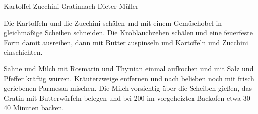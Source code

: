 \begin{recipe}{Kartoffel-Zucchini-Gratin}{nach Dieter Müller}
  \inglist

  \steps
  Die Kartoffeln und die Zucchini schälen und mit einem Gemüsehobel in
  gleichmäßige Scheiben schneiden. Die Knoblauchzehen schälen und eine
  feuerfeste Form damit ausreiben, dann mit Butter auspinseln und Kartoffeln
  und Zucchini einschichten.

  Sahne und Milch mit Rosmarin und Thymian einmal aufkochen und mit Salz und
  Pfeffer kräftig würzen. Kräuterzweige entfernen und nach belieben noch mit
  frisch geriebenen Parmesan mischen. Die Milch vorsichtig über die Scheiben
  gießen, das Gratin mit Butterwürfeln belegen und bei 200 \celsius im
  vorgeheizten Backofen etwa 30-40 Minuten backen.
\end{recipe}
